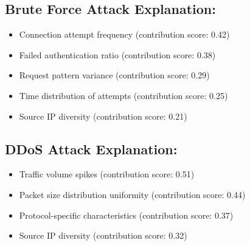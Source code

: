 \documentclass[12pt]{article}
\begin{document}
\subsection{Brute Force Attack Explanation:}
\begin{itemize}
\item Connection attempt frequency (contribution score: 0.42)
\end{itemize}

\begin{itemize}
\item Failed authentication ratio (contribution score: 0.38)
\end{itemize}

\begin{itemize}
\item Request pattern variance (contribution score: 0.29)
\end{itemize}

\begin{itemize}
\item Time distribution of attempts (contribution score: 0.25)
\end{itemize}

\begin{itemize}
\item Source IP diversity (contribution score: 0.21)
\end{itemize}

\subsection{DDoS Attack Explanation:}
\begin{itemize}
\item Traffic volume spikes (contribution score: 0.51)
\end{itemize}

\begin{itemize}
\item Packet size distribution uniformity (contribution score: 0.44)
\end{itemize}

\begin{itemize}
\item Protocol-specific characteristics (contribution score: 0.37)
\end{itemize}

\begin{itemize}
\item Source IP diversity (contribution score: 0.32)
\end{itemize}
\end{document}
